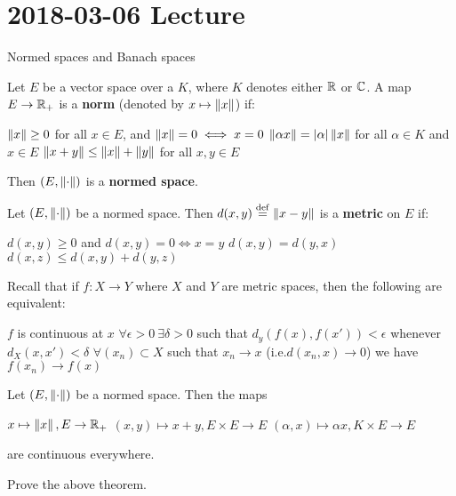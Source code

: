 \section{2018-03-06 Lecture}

Normed spaces and Banach spaces

\begin{defn}
	Let $E$ be a vector space over a $K$, where $K$ denotes either $\mathbb{R}$ or $\mathbb{C}$.
	A map $E \to \mathbb{R}_+$ is a \textbf{norm} (denoted by $x \mapsto \left\lVert x \right\rVert$) if:
	\begin{enum}
		\io $\left\lVert x \right\rVert \geq 0$ for all $x \in E$, and $\left\lVert x \right\rVert=0 \iff x=0$
		\io $\left\lVert \alpha x \right\rVert = \left\lvert \alpha \right\rvert \left\lVert x \right\rVert$ for all $\alpha \in K$ and $x \in E$
		\io $\left\lVert x+y \right\rVert \leq \left\lVert x \right\rVert + \left\lVert y \right\rVert$ for all $x,y \in E$
	\end{enum}
	Then $(E,\left\lVert \cdot \right\rVert)$ is a \textbf{normed space}.
\end{defn}

\begin{prop}
	Let $(E,\left\lVert \cdot \right\rVert)$ be a normed space.
	Then $d(x,y) \overset{\mathrm{def}}{=} \left\lVert x-y \right\rVert$ is a \textbf{metric} on $E$ if:
	\begin{enum}
		\io $d(x,y) \geq 0$ and $d(x,y)=0 \iff x=y$
		\io $d(x,y)=d(y,x)$
		\io $d(x,z) \leq d(x,y) + d(y,z)$
	\end{enum}
\end{prop}

\begin{prop}
	Recall that if $f:X \to Y$ where $X$ and $Y$ are metric spaces, then the following are equivalent:
	\begin{enum}
		\io $f$ is continuous at $x$
		\io $\forall \epsilon>0 \: \exists \delta>0$ such that $d_y(f(x),f(x'))<\epsilon$ whenever $d_X(x,x')<\delta$
		\io $\forall (x_n) \subset X$ such that $x_n \to x$ (i.e.\@ $d(x_n,x) \to 0$) we have $f(x_n) \to f(x)$
	\end{enum}
\end{prop}

\begin{thm}
	Let $(E,\left\lVert \cdot \right\rVert)$ be a normed space.
	Then the maps
	\begin{enum}
		\io $x \mapsto \left\lVert x \right\rVert, E \to \mathbb{R}_+$
		\io $(x,y) \mapsto x+y, E \times E \to E$
		\io $(\alpha,x) \mapsto \alpha x, K \times E \to E$
	\end{enum}
	are continuous everywhere.
\end{thm}

\begin{exer}
	Prove the above theorem.
\end{exer}

